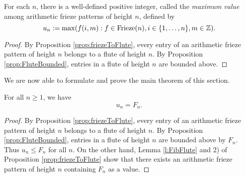 \begin{corollary}
    \label{l:maxDefined}
    \leanok
    For each $n$, there is a well-defined
    positive integer, called the {\it maximum value} among arithmetic frieze patterns of height $n$, defined by
    \[
        u_n := \max ( f (i,m) : f \in  {\rm Frieze}(n), i \in \{1,\ldots, n\}, m \in \mathbb{Z}).
    \]
\end{corollary}
\begin{proof}
    By Proposition \ref{prop:friezeToFlute}, every entry of an arithmetic frieze pattern of height $n$ belongs to a flute of height $n$.
    By Proposition \ref{prop:FluteBounded}, entries in a flute of height $n$ are bounded above.
\end{proof}


We are now able to formulate and prove the main theorem of this section.
\begin{theorem}
    \label{mainTheorem}
    For all $n \geq 1$, we have 
    \[
        u_n = F_{n}.
    \]    
\end{theorem}
\begin{proof}
    By Proposition \ref{prop:friezeToFlute}, every entry of an arithmetic frieze pattern of height $n$ belongs to a flute of height $n$.
    By Proposition \ref{prop:FluteBounded}, entries in a flute of height $n$ are bounded above by $F_n$. Thus $u_n \leq F_n$ for all $n$. 
On the other hand, Lemma \ref{l:FibFlute} and 2) of Proposition \ref{prop:friezeToFlute} show that 
there exists an arithmetic frieze pattern of height $n$ containing $F_n$ as a value.
\end{proof}